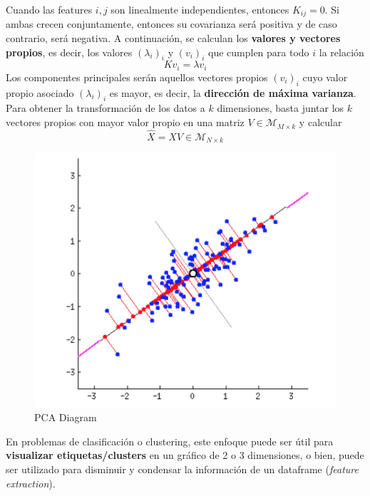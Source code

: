Cuando las features $i,j$ son linealmente independientes, entonces $K_{ij} = 0$. Si ambas crecen conjuntamente, entonces su covarianza será positiva y de caso contrario, será negativa. A continuación, se calculan los \textbf{valores y vectores propios}, es decir, los valores $(\lambda_i)_i$ y $(v_i)_i$ que cumplen para todo $i$ la relación 
$$
K v_i = \lambda v_i 
$$
Los componentes principales serán aquellos vectores propios $(v_i)_i$ cuyo valor propio asociado $(\lambda_i)_i$ es mayor, es decir, la \textbf{dirección de máxima varianza}. Para obtener la transformación de los datos a $k$ dimensiones, basta juntar los $k$ vectores propios con mayor valor propio en una matriz $V \in \mathcal{M}_{M \times k}$ y calcular 
$$ 
\hat{X} = XV \in \mathcal{M}_{N \times k}
$$
\begin{figure}[H]
    \center
    \includegraphics[scale=0.9]{notebooks/ML/img/pca_diagram.png}
    \caption{PCA Diagram}
\end{figure}
En problemas de clasificación o clustering, este enfoque puede ser útil para \textbf{visualizar etiquetas/clusters} en un gráfico de 2 o 3 dimensiones, o bien, puede ser utilizado para disminuir y condensar la información de un dataframe (\textit{feature extraction}). 

